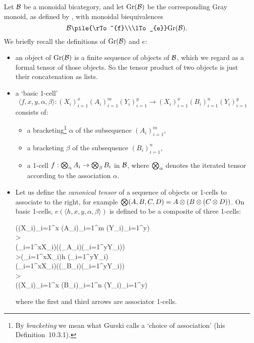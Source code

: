 \documentclass{robinthesisdraft}
\begin{document}
Let $\mathcal{B}$ be a monoidal bicategory, and let $\mathrm{Gr}(\mathcal{B})$ be the
corresponding Gray monoid, as defined by \citet[][Chapter~10]{GurskiThesis},
with monoidal biequivalences
\[
	\B \pile{\rTo^{f}\\\lTo_{e}} \Gr(\B).
\]
We briefly recall the definitions of $\mathrm{Gr}(\mathcal{B})$ and $e$:
\begin{itemize}
	\item an object of $\mathrm{Gr}(\mathcal{B})$ is a finite sequence of objects of $\mathcal{B}$,
		which we regard as a formal tensor of those objects. So the tensor
		product of two objects is just their concatenation as lists.
	\item a `basic 1-cell'
	\[
		\langle f,x,y,\alpha,\beta \rangle:
		(X_{i})_{i=1}^{x} (A_{i})_{i=1}^{m} (Y_{i})_{i=1}^{y}
		\to
		(X_{i})_{i=1}^{x} (B_{i})_{i=1}^{n} (Y_{i})_{i=1}^{y}
	\]
	consists of:
	\begin{itemize}
		\item a bracketing\footnote{
			By \emph{bracketing} we mean what Gurski calls a `choice of association'
			(his Definition~10.3.1).
		} $\alpha$ of the subsequence $(A_{i})_{i=1}^{m}$,
		\item a bracketing $\beta$ of the subsequence $(B_{i})_{i=1}^{n}$,
		\item a 1-cell $f: \bigotimes_{\alpha}A_{i} \to \bigotimes_{\beta}B_{i}$ in $\mathcal{B}$,
			where $\bigotimes_{\alpha}$ denotes the iterated tensor according to the
			association $\alpha$.
	\end{itemize}
	\item Let us define the \emph{canonical tensor} of a sequence of objects or 1-cells to
	associate to the right, for example $\Tn(A,B,C,D) = A\tn(B\tn(C\tn D))$.
	On basic 1-cells, $e(\langle h,x,y,\alpha,\beta \rangle)$ is defined to
		be a composite of three 1-cells:
		\begin{diagram}
			\Tn((X_{i})_{i=1}^{x} (A_{i})_{i=1}^{m} (Y_{i})_{i=1}^{y}) \\
			\dTo>{\cong} \\
			(\Tn_{i=1}^{x}X_{i})\tn\bigl((\Tn_{\alpha}A_{i})\tn(\Tn_{i=1}^{y}Y_{i})\bigr) \\
			\dTo>{(\Tn_{i=1}^{x}X_{i})\tn h \tn(\Tn_{i=1}^{y}Y_{i})} \\
			(\Tn_{i=1}^{x}X_{i})\tn\bigl((\Tn_{\beta}B_{i})\tn(\Tn_{i=1}^{y}Y_{i})\bigr) \\
			\dTo>{\cong} \\
			\Tn((X_{i})_{i=1}^{x} (B_{i})_{i=1}^{n} (Y_{i})_{i=1}^{y})
		\end{diagram}
		where the first and third arrows are associator 1-cells.%

\end{itemize}
\end{document}
